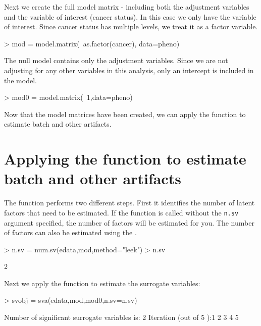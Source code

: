 \documentclass[12pt]{article}
\begin{document}
Next we create the full model matrix - including both the adjustment variables and the variable of interest (cancer status). In this case we only have the variable of interest. Since cancer status has multiple levels, we treat it as a factor variable. 

\begin{Schunk}
\begin{Sinput}
> mod = model.matrix(~as.factor(cancer), data=pheno)
\end{Sinput}
\end{Schunk}

The null model contains only the adjustment variables. Since we are not adjusting for any other variables in this analysis, only an intercept is included in the model. 
\begin{Schunk}
\begin{Sinput}
> mod0 = model.matrix(~1,data=pheno)
\end{Sinput}
\end{Schunk}

Now that the model matrices have been created, we can apply the  function to estimate batch and other artifacts. 

\section{Applying the  function to estimate batch and other artifacts} 

The  function performs two different steps. First it identifies the number of latent factors that need to be estimated. If the  function is called without the \texttt{n.sv} argument specified, the number of factors will be estimated for you. The number of factors can also be estimated using the .

\begin{Schunk}
\begin{Sinput}
> n.sv = num.sv(edata,mod,method="leek")
> n.sv
\end{Sinput}
\begin{Soutput}
[1] 2
\end{Soutput}
\end{Schunk}

Next we apply the  function to estimate the surrogate variables:

\begin{Schunk}
\begin{Sinput}
> svobj = sva(edata,mod,mod0,n.sv=n.sv)
\end{Sinput}
\begin{Soutput}
Number of significant surrogate variables is:  2 
Iteration (out of 5 ):1  2  3  4  5  
\end{Soutput}
\end{Schunk}
\end{document}
